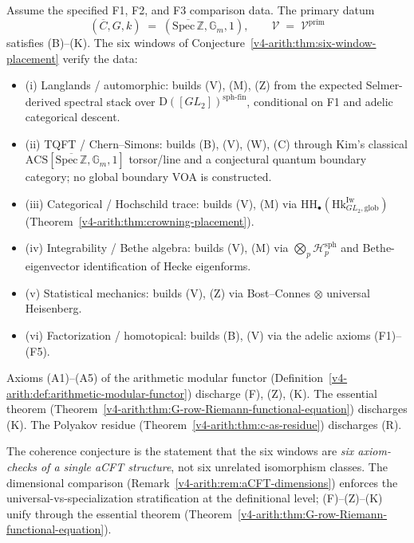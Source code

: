 \begin{conjecture}
\label{v4-arith:thm:aCFT-coherence}
Assume the specified F1, F2, and F3 comparison data. The primary
datum
\begin{equation*}
(\overline{C},G,k)\;=\;(\overline{\mathrm{Spec}\,\mathbb{Z}},\mathbb{G}_{m},1),\qquad
\mathcal{V}\;=\;\mathcal{V}^{\mathrm{prim}}
\end{equation*}
satisfies (B)--(K). The six windows of
Conjecture~\ref{v4-arith:thm:six-window-placement} verify the data:
\begin{itemize}
\item (i) Langlands / automorphic: builds (V), (M), (Z) from the
expected Selmer-derived spectral stack over
\(\mathrm{D}([GL_{2}])^{\mathrm{sph\text{-}fin}}\), conditional on
F1 and adelic categorical descent.
\item (ii) TQFT / Chern--Simons: builds (B), (V), (W), (C) through
Kim's classical
\(\mathrm{ACS}[\overline{\mathrm{Spec}\,\mathbb{Z}},\mathbb{G}_{m},1]\)
torsor/line and a conjectural quantum boundary category; no global
boundary VOA is constructed.
\item (iii) Categorical / Hochschild trace: builds (V), (M) via
\(\mathrm{HH}_{\bullet}(\mathrm{Hk}^{\mathrm{Iw}}_{GL_{2},\mathrm{glob}})\)
(Theorem~\ref{v4-arith:thm:crowning-placement}).
\item (iv) Integrability / Bethe algebra: builds (V), (M) via
\(\bigotimes_{p}\mathcal{H}_{p}^{\mathrm{sph}}\) and Bethe-eigenvector
identification of Hecke eigenforms.
\item (v) Statistical mechanics: builds (V), (Z) via
Bost--Connes \(\otimes\) universal Heisenberg.
\item (vi) Factorization / homotopical: builds (B), (V) via the
adelic axioms (F1)--(F5).
\end{itemize}
Axioms (A1)--(A5) of the arithmetic modular functor
(Definition~\ref{v4-arith:def:arithmetic-modular-functor}) discharge (F),
(Z), (K). The essential theorem
(Theorem~\ref{v4-arith:thm:G-row-Riemann-functional-equation}) discharges
(K). The Polyakov residue
(Theorem~\ref{v4-arith:thm:c-as-residue}) discharges (R).
\end{conjecture}

\begin{remark}
The coherence conjecture is the statement that the six windows are
\emph{six axiom-checks of a single aCFT structure}, not six
unrelated isomorphism classes. The dimensional comparison
(Remark~\ref{v4-arith:rem:aCFT-dimensions}) enforces the
universal-vs-specialization stratification at the definitional
level; (F)--(Z)--(K) unify through the essential theorem
(Theorem~\ref{v4-arith:thm:G-row-Riemann-functional-equation}).
\end{remark}

